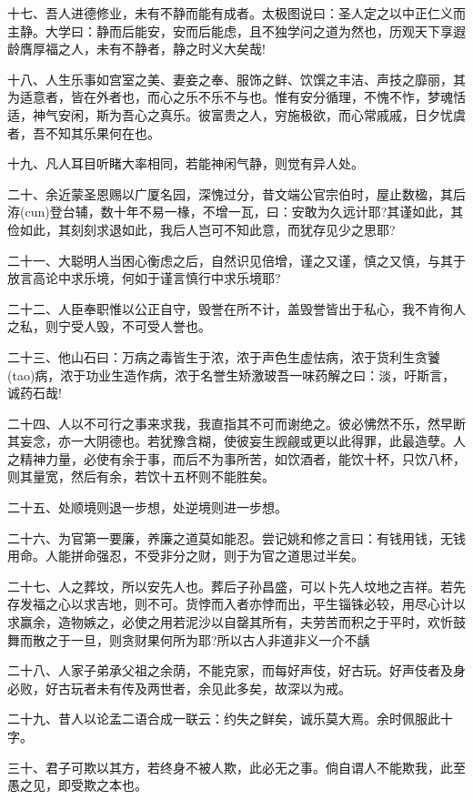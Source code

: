 \documentclass[letterpaper,12pt,english]{sphinxmanual}
\begin{document}
十七、吾人进德修业，未有不静而能有成者。太极图说曰：圣人定之以中正仁义而主静。大学曰：静而后能安，安而后能虑，且不独学问之道为然也，历观天下享遐龄膺厚福之人，未有不静者，静之时义大矣哉!

十八、人生乐事如宫室之美、妻妾之奉、服饰之鲜、饮馔之丰洁、声技之靡丽，其为适意者，皆在外者也，而心之乐不乐不与也。惟有安分循理，不愧不怍，梦魂恬适，神气安闲，斯为吾心之真乐。彼富贵之人，穷施极欲，而心常戚戚，日夕忧虞者，吾不知其乐果何在也。

十九、凡人耳目听睹大率相同，若能神闲气静，则觉有异人处。

二十、余近蒙圣恩赐以广厦名园，深愧过分，昔文端公官宗伯时，屋止数楹，其后洊(cun)登台辅，数十年不易一椽，不增一瓦，曰：安敢为久远计耶?其谨如此，其俭如此，其刻刻求退如此，我后人岂可不知此意，而犹存见少之思耶?

二十一、大聪明人当困心衡虑之后，自然识见倍增，谨之又谨，慎之又慎，与其于放言高论中求乐境，何如于谨言慎行中求乐境耶?

二十二、人臣奉职惟以公正自守，毁誉在所不计，盖毁誉皆出于私心，我不肯徇人之私，则宁受人毁，不可受人誉也。

二十三、他山石曰：万病之毒皆生于浓，浓于声色生虚怯病，浓于货利生贪饕(tao)病，浓于功业生造作病，浓于名誉生矫激玻吾一味药解之曰：淡，吁斯言，诚药石哉!

二十四、人以不可行之事来求我，我直指其不可而谢绝之。彼必怫然不乐，然早断其妄念，亦一大阴德也。若犹豫含糊，使彼妄生觊觎或更以此得罪，此最造孽。人之精神力量，必使有余于事，而后不为事所苦，如饮酒者，能饮十杯，只饮八杯，则其量宽，然后有余，若饮十五杯则不能胜矣。

二十五、处顺境则退一步想，处逆境则进一步想。

二十六、为官第一要廉，养廉之道莫如能忍。尝记姚和修之言曰：有钱用钱，无钱用命。人能拼命强忍，不受非分之财，则于为官之道思过半矣。

二十七、人之葬坟，所以安先人也。葬后子孙昌盛，可以卜先人坟地之吉祥。若先存发福之心以求吉地，则不可。货悖而入者亦悖而出，平生锱铢必较，用尽心计以求赢余，造物嫉之，必使之用若泥沙以自罄其所有，夫劳苦而积之于平时，欢忻鼓舞而散之于一旦，则贪财果何所为耶?所以古人非道非义一介不龋

二十八、人家子弟承父祖之余荫，不能克家，而每好声伎，好古玩。好声伎者及身必败，好古玩者未有传及两世者，余见此多矣，故深以为戒。

二十九、昔人以论孟二语合成一联云：约失之鲜矣，诚乐莫大焉。余时佩服此十字。

三十、君子可欺以其方，若终身不被人欺，此必无之事。倘自谓人不能欺我，此至愚之见，即受欺之本也。
\end{document}
